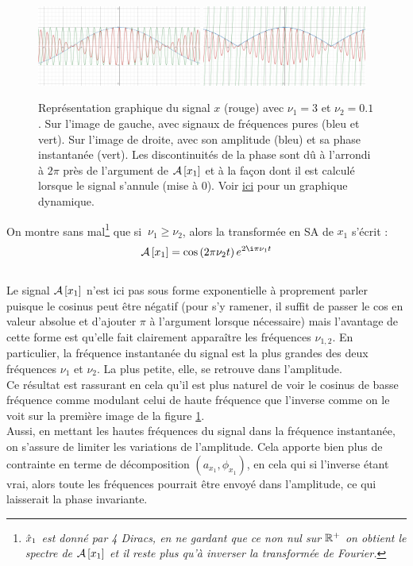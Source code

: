 \begin{figure}[h]\centering
	\includegraphics[width=0.48\textwidth]{fig/ex SA - 11.png}
	\hfill
	\includegraphics[width=0.48\textwidth]{fig/ex SA - 12.png}
	\caption{Représentation graphique du signal $x$ (rouge) avec $\nu_1=3$ et $\nu_2=0.1$. Sur l'image de gauche, avec signaux de fréquences pures (bleu et vert). Sur l'image de droite, avec son amplitude (bleu) et sa phase instantanée (vert). Les discontinuités de la phase sont dû à l'arrondi à $2\pi$  près de l'argument de $\mathcal{A}\left[x_1\right]$ et à la façon dont il est calculé lorsque le signal s'annule (mise à 0). Voir \href{https://www.desmos.com/calculator/gcedcdfkhr}{ici} pour un graphique dynamique.}
	\label{fig:exemple_tSA_1/2}
\end{figure}

\noindent
On montre sans mal\footnote{\itshape
	$\hat{x}_1$ est donné par 4 Diracs, en ne gardant que ce non nul sur $\mathbb{R}^+$ on obtient le spectre de $\mathcal{A}\left[x_1\right]$ et il reste plus qu'à inverser la transformée de Fourier.}
que si $\ \nu_1\geq\nu_2$, alors la transformée en SA de $x_1$ s'écrit :
\[\SA{x_1} = \cos \left(2\pi\nu_2 t\right) e^{2\i\pi\nu_1 t}\]
\\
Le signal $\mathcal{A}\left[x_1\right]$ n'est ici pas sous forme exponentielle à proprement parler puisque le cosinus peut être négatif (pour s'y ramener, il suffit de passer le cos en valeur absolue et d'ajouter $\pi$ à l'argument lorsque nécessaire) mais l’avantage de cette forme est qu'elle fait clairement apparaître les fréquences $\nu_{1,2}$. En particulier, la fréquence instantanée du signal est la plus grandes des deux fréquences $\nu_1$ et $\nu_2$. La plus petite, elle, se retrouve dans l'amplitude. 
\\
Ce résultat est rassurant en cela qu'il est plus naturel de voir le cosinus de basse fréquence comme modulant celui de haute fréquence que l'inverse comme on le voit sur la première image de la figure \ref{fig:exemple_tSA_1/2}. 
\\
Aussi, en mettant les hautes fréquences du signal dans la fréquence instantanée, on s'assure de limiter les variations de l'amplitude. Cela apporte bien plus de contrainte en terme de décomposition $(a_{x_1},\phi_{x_1})$, en cela qui si l'inverse étant vrai, alors toute les fréquences pourrait être envoyé dans l'amplitude, ce qui laisserait la phase invariante.
\\

